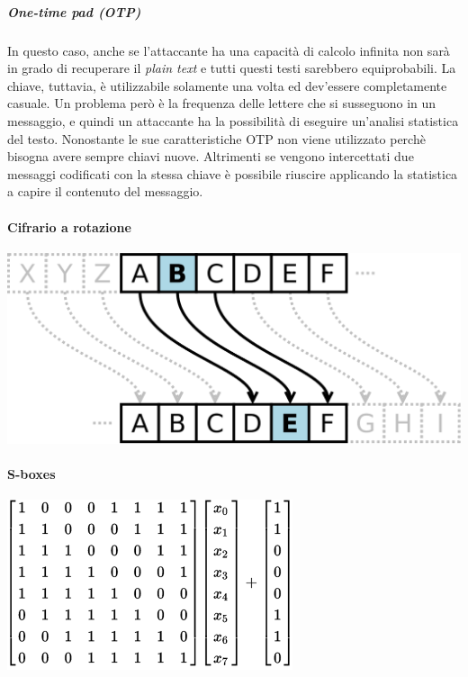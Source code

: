 \subparagraph*{One-time pad (OTP)}
In questo caso, anche se l'attaccante ha una capacità di calcolo infinita non 
sarà in grado di recuperare il \textit{plain text} e tutti questi testi 
sarebbero equiprobabili.
La chiave, tuttavia, è utilizzabile solamente una volta ed dev'essere 
completamente casuale.
Un problema però è la frequenza delle lettere che si susseguono in un messaggio, 
e quindi un attaccante ha la possibilità di eseguire un'analisi statistica del 
testo.
Nonostante le sue caratteristiche OTP non viene utilizzato perchè bisogna avere 
sempre chiavi nuove. Altrimenti se vengono intercettati due messaggi codificati 
con la stessa chiave è possibile riuscire applicando la statistica a capire il 
contenuto del messaggio.

\paragraph{Cifrario a rotazione}

\begin{center}
  \includegraphics[scale=0.2]{res/img/caesar.png}
  \label{fig:password:caesar}
\end{center}


\paragraph{S-boxes}

\begin{center}
  \includegraphics[scale=0.5]{res/img/sboxes.png}
  \label{fig:password:sboxes}
\end{center}


